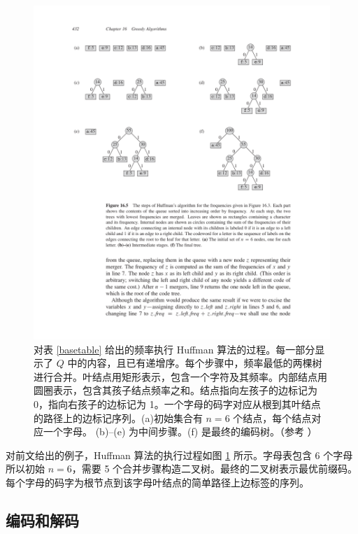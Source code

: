 \begin{figure}[htbp]
\begin{center}
\includegraphics[trim=28mm 102mm 22mm 24mm,clip]{image/clrs_huffman.pdf}
\end{center}
\caption{\label{clrs_huffman} 对表 \ref{basetable} 给出的频率执行 Huffman 算法的过程。每一部分显示了 $Q$ 中的内容，且已有递增序。每个步骤中，频率最低的两棵树进行合并。叶结点用矩形表示，包含一个字符及其频率。内部结点用圆圈表示，包含其孩子结点频率之和。结点指向左孩子的边标记为 0，指向右孩子的边标记为 1。一个字母的码字对应从根到其叶结点的路径上的边标记序列。(a)初始集合有 $n=6$ 个结点，每个结点对应一个字母。 (b)--(e) 为中间步骤。(f) 是最终的编码树。（参考 \cite{clrs}）}
\end{figure}

对前文给出的例子，Huffman 算法的执行过程如图 \ref{clrs_huffman} 所示。字母表包含 6 个字母所以初始 $n=6$，需要 5 个合并步骤构造二叉树。最终的二叉树表示最优前缀码。每个字母的码字为根节点到该字母叶结点的简单路径上边标签的序列。

\subsection{编码和解码}

